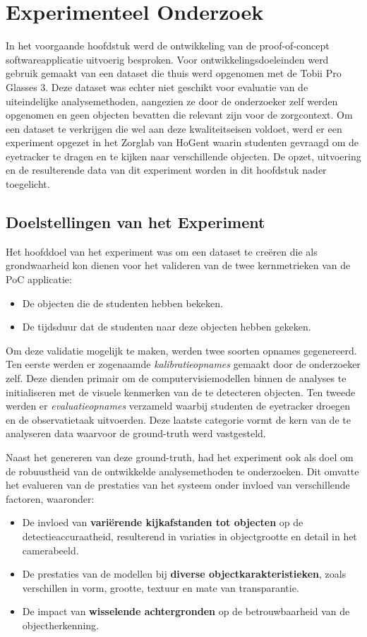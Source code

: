 \chapter{Experimenteel Onderzoek}
\label{ch:experiment}

In het voorgaande hoofdstuk werd de ontwikkeling van de proof-of-concept softwareapplicatie uitvoerig besproken.
Voor ontwikkelingsdoeleinden werd gebruik gemaakt van een dataset die thuis werd opgenomen met de Tobii Pro Glasses 3.
Deze dataset was echter niet geschikt voor evaluatie van de uiteindelijke analysemethoden, aangezien ze door de onderzoeker zelf werden opgenomen en geen objecten bevatten die relevant zijn voor de zorgcontext.
Om een dataset te verkrijgen die wel aan deze kwaliteitseisen voldoet, werd er een experiment opgezet in het Zorglab van HoGent waarin studenten gevraagd om de eyetracker te dragen en te kijken naar verschillende objecten.
De opzet, uitvoering en de resulterende data van dit experiment worden in dit hoofdstuk nader toegelicht.

\section{Doelstellingen van het Experiment}

Het hoofddoel van het experiment was om een dataset te creëren die als grondwaarheid kon dienen voor het valideren van de twee kernmetrieken van de PoC applicatie:
\begin{itemize}
    \item De objecten die de studenten hebben bekeken.
    \item De tijdsduur dat de studenten naar deze objecten hebben gekeken.
\end{itemize}
Om deze validatie mogelijk te maken, werden twee soorten opnames gegenereerd. 
Ten eerste werden er zogenaamde \textit{kalibratieopnames} gemaakt door de onderzoeker zelf. 
Deze dienden primair om de computervisiemodellen binnen de analyses te initialiseren met de visuele kenmerken van de te detecteren objecten. 
Ten tweede werden er \textit{evaluatieopnames} verzameld waarbij studenten de eyetracker droegen en de observatietaak uitvoerden. 
Deze laatste categorie vormt de kern van de te analyseren data waarvoor de ground-truth werd vastgesteld.

Naast het genereren van deze ground-truth, had het experiment ook als doel om de robuustheid van de ontwikkelde analysemethoden te onderzoeken. 
Dit omvatte het evalueren van de prestaties van het systeem onder invloed van verschillende factoren, waaronder:
\begin{itemize}
    \item De invloed van \textbf{variërende kijkafstanden tot objecten} op de detectieaccuraatheid, resulterend in variaties in objectgrootte en detail in het camerabeeld.
    \item De prestaties van de modellen bij \textbf{diverse objectkarakteristieken}, zoals verschillen in vorm, grootte, textuur en mate van transparantie.
    \item De impact van \textbf{wisselende achtergronden} op de betrouwbaarheid van de objectherkenning.
\end{itemize}

